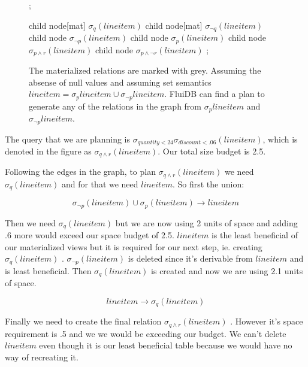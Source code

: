 \begin{figure}[H]
  \begin{tikzdiagram}
    ;

    \newcommand{\n}[1]{node {\(#1\)}}
    \newcommand{\bn}[1]{node[mat] {\(#1\)}}

    child { \bn{\sigma_{q}(lineitem)}} %
    child { \bn{\sigma_{\neg q}(lineitem)}} %
    child { \n{\sigma_{\neg p}(lineitem)}}  %
    child {
      \n{\sigma_{p}(lineitem)} %
      child {\n{\sigma_{p \land r}(lineitem)} } %
      child {\n{\sigma_{p \land \neg r}(lineitem) }} %
    } ;
\end{tikzdiagram}
\caption{\label{fig:intro_selectexample}The materialized relations are
  marked with grey. Assuming the absense of null values and assuming
  set semantics
  \(lineitem = \sigma_p lineitem \cup \sigma_{\neg p} lineitem\).
  FluiDB can find a plan to generate any of the relations in the graph
  from \(\sigma_p lineitem\) and \(\sigma_{\neg p} lineitem\).  }
\end{figure}


The query that we are planning is
\(\sigma_{quantity < 24} \sigma_{discount < .06} (lineitem)\), which
is denoted in the figure as \(\sigma_{q \land r}(lineitem)\). Our
total size budget is 2.5.

Following the edges in the graph, to plan
\(\sigma_{q \land r}(lineitem)\) we need \(\sigma_{q}(lineitem)\) and
for that we need \(lineitem\). So first the union:

\[
  \sigma_{\neg p}(lineitem) \cup \sigma_{p}(lineitem) \rightarrow lineitem
\]

Then we need \(\sigma_{q}(lineitem)\) but we are now using 2 units of
space and adding .6 more would exceed our space budget of
2.5. \(lineitem\) is the least beneficial of our materialized views
but it is required for our next step, ie. creating
\(\sigma_{q}(lineitem)\) . \(\sigma_{\neg p}(lineitem)\) is deleted
since it's derivable from \(lineitem\) and is least beneficial. Then
\(\sigma_{q}(lineitem)\) is created and now we are using 2.1 units of
space.

\[
  lineitem \rightarrow \sigma_{q}(lineitem)
\]

Finally we need to create the final relation \(\sigma_{q \land
  r}(lineitem)\) . However it's space requirement is .5 and we we would
be exceeding our budget. We can't delete \(lineitem\) even though it
is our least beneficial table because we would have no way of
recreating it.


